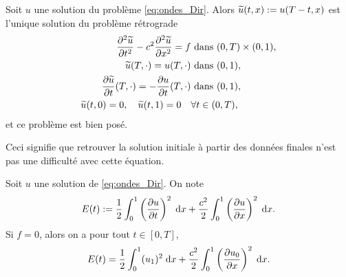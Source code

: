 \documentclass[12pt,a4paper,twoside]{article}
\begin{document}





\begin{proposition}
  Soit $u$ une solution du probl\`eme \eqref{eq:ondes_Dir}.
  Alors $\widetilde{u}(t,x) := u(T-t,x)$ est l'unique solution du probl\`eme
  r\'etrograde
  \begin{align*}
    \dfrac{\partial^2 \widetilde{u}}{\partial t^2} - c^2 \dfrac{\partial^2 \widetilde{u}}{\partial x^2} = f 
    &\text{ dans } (0,T) \times (0,1) ,
    \\
    \widetilde{u}(T,\cdot) = u(T,\cdot) 
    & \text{ dans } (0,1) ,
    \\
    \dfrac{\partial \widetilde{u}}{\partial t}(T,\cdot) = - \dfrac{\partial u}{\partial t}(T,\cdot) 
    & \text{ dans } (0,1) ,
    \\
    \widetilde{u}(t,0) = 0 , \quad \widetilde{u}(t,1) = 0 
    \quad& \forall t \in (0,T) ,
  \end{align*}
  et ce probl\`eme est bien pos\'e.
\end{proposition}
Ceci signifie que retrouver la solution initiale \`a partir des donn\'ees
finales n'est pas une difficult\'e avec cette \'equation.

\begin{proposition}
  \label{prop:ondes_energie}
  Soit $u$ une solution de \eqref{eq:ondes_Dir}.
  On note
  \begin{align*}
    E(t) := \dfrac{1}{2} \int_0^1 \left( \dfrac{\partial u}{\partial t}
    \right)^2 \;\mathrm{d} x + \dfrac{c^2}{2} \int_0^1 \left( \dfrac{\partial u}{\partial x}
    \right)^2 \;\mathrm{d} x .
  \end{align*}
  Si $f = 0$, alors on a pour tout $t \in [0,T]$,
  \begin{align*}
    E(t) = \dfrac{1}{2} \int_0^1 (u_1)^2 \;\mathrm{d} x
    + \dfrac{c^2}{2} \int_0^1 \left(\dfrac{\partial u_0}{\partial x} \right)^2 \;\mathrm{d} x .
  \end{align*}
\end{proposition}
\end{document}
